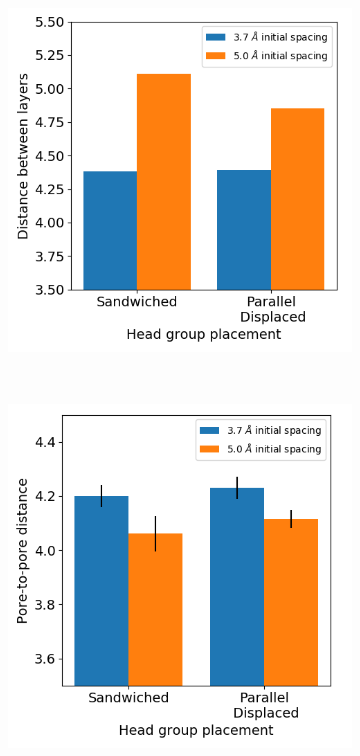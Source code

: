 \documentclass{article}
\begin{document}
\begin{figure}
\begin{subfigure}{0.45\linewidth}
                \centering
                \includegraphics[width=\linewidth]{dbwl.png}
                \caption{}~\label{fig:dbwl_disordered}
        \end{subfigure}%
        \begin{subfigure}{0.45\linewidth}
                \centering
                \includegraphics[width=\linewidth]{p2p2.png}

\end{subfigure}
\end{figure}
\end{document}
